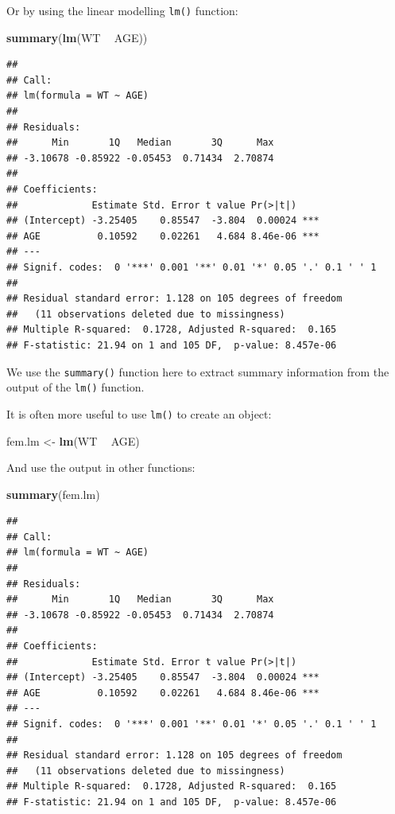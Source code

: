 \documentclass[]{book}
\newenvironment{Shaded}{\begin{snugshade}}{\end{snugshade}}
\newcommand{\KeywordTok}[1]{\textcolor[rgb]{0.13,0.29,0.53}{\textbf{#1}}}
\newcommand{\StringTok}[1]{\textcolor[rgb]{0.31,0.60,0.02}{#1}}
\newcommand{\OperatorTok}[1]{\textcolor[rgb]{0.81,0.36,0.00}{\textbf{#1}}}
\newcommand{\NormalTok}[1]{#1}
\theoremstyle{definition}
\theoremstyle{definition}
\theoremstyle{definition}
\theoremstyle{remark}
\begin{document}
Or by using the linear modelling \texttt{lm()} function:

\begin{Shaded}
\begin{Highlighting}[]
\KeywordTok{summary}\NormalTok{(}\KeywordTok{lm}\NormalTok{(WT }\OperatorTok{~}\StringTok{ }\NormalTok{AGE))}
\end{Highlighting}
\end{Shaded}

\begin{verbatim}
## 
## Call:
## lm(formula = WT ~ AGE)
## 
## Residuals:
##      Min       1Q   Median       3Q      Max 
## -3.10678 -0.85922 -0.05453  0.71434  2.70874 
## 
## Coefficients:
##             Estimate Std. Error t value Pr(>|t|)    
## (Intercept) -3.25405    0.85547  -3.804  0.00024 ***
## AGE          0.10592    0.02261   4.684 8.46e-06 ***
## ---
## Signif. codes:  0 '***' 0.001 '**' 0.01 '*' 0.05 '.' 0.1 ' ' 1
## 
## Residual standard error: 1.128 on 105 degrees of freedom
##   (11 observations deleted due to missingness)
## Multiple R-squared:  0.1728, Adjusted R-squared:  0.165 
## F-statistic: 21.94 on 1 and 105 DF,  p-value: 8.457e-06
\end{verbatim}

We use the \texttt{summary()} function here to extract summary
information from the output of the \texttt{lm()} function.

It is often more useful to use \texttt{lm()} to create an object:

\begin{Shaded}
\begin{Highlighting}[]
\NormalTok{fem.lm <-}\StringTok{ }\KeywordTok{lm}\NormalTok{(WT }\OperatorTok{~}\StringTok{ }\NormalTok{AGE)}
\end{Highlighting}
\end{Shaded}

And use the output in other functions:

\begin{Shaded}
\begin{Highlighting}[]
\KeywordTok{summary}\NormalTok{(fem.lm)}
\end{Highlighting}
\end{Shaded}

\begin{verbatim}
## 
## Call:
## lm(formula = WT ~ AGE)
## 
## Residuals:
##      Min       1Q   Median       3Q      Max 
## -3.10678 -0.85922 -0.05453  0.71434  2.70874 
## 
## Coefficients:
##             Estimate Std. Error t value Pr(>|t|)    
## (Intercept) -3.25405    0.85547  -3.804  0.00024 ***
## AGE          0.10592    0.02261   4.684 8.46e-06 ***
## ---
## Signif. codes:  0 '***' 0.001 '**' 0.01 '*' 0.05 '.' 0.1 ' ' 1
## 
## Residual standard error: 1.128 on 105 degrees of freedom
##   (11 observations deleted due to missingness)
## Multiple R-squared:  0.1728, Adjusted R-squared:  0.165 
## F-statistic: 21.94 on 1 and 105 DF,  p-value: 8.457e-06
\end{verbatim}
\end{document}
